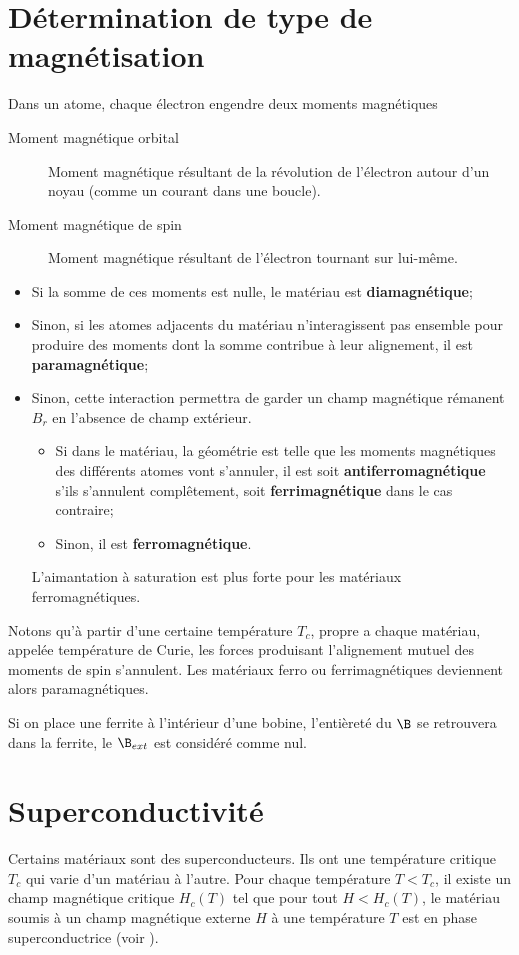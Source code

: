 \section{Détermination de type de magnétisation}
Dans un atome, chaque électron engendre deux moments magnétiques
\begin{description}
  \item[Moment magnétique orbital]
    Moment magnétique résultant de la révolution de
    l'électron autour d'un noyau (comme un courant dans une boucle).
  \item[Moment magnétique de spin]
    Moment magnétique résultant de l'électron tournant sur lui-même.
\end{description}
\begin{itemize}
  \item Si la somme de ces moments est nulle,
    le matériau est \textbf{diamagnétique};
  \item Sinon, si les atomes adjacents du matériau n'interagissent pas
    ensemble pour produire des moments dont la somme contribue
    à leur alignement, il est \textbf{paramagnétique};
  \item Sinon, cette interaction permettra de garder un champ magnétique
    rémanent $B_r$ en l'absence de champ extérieur.
    \begin{itemize}
      \item Si dans le matériau,
        la géométrie est telle que les moments magnétiques des différents
        atomes vont s'annuler,
        il est soit \textbf{antiferromagnétique} s'ils s'annulent complêtement,
        soit \textbf{ferrimagnétique} dans le cas contraire;
      \item Sinon, il est \textbf{ferromagnétique}.
    \end{itemize}
    L'aimantation à saturation est plus forte pour
    les matériaux ferromagnétiques.
\end{itemize}
Notons qu'à partir d'une certaine température $T_c$,
propre a chaque matériau,
appelée température de Curie, les forces produisant l'alignement mutuel
des moments de spin s'annulent.
Les matériaux ferro ou ferrimagnétiques deviennent alors paramagnétiques.

Si on place une ferrite à l'intérieur d'une bobine,
l'entièreté du $\B$ se retrouvera dans la ferrite,
le $\B_{ext}$ est considéré comme nul.

\section{Superconductivité}
Certains matériaux sont des superconducteurs.
Ils ont une température critique $T_c$ qui varie d'un matériau à l'autre.
Pour chaque température $T < T_c$,
il existe un champ magnétique critique $H_c(T)$ tel que
pour tout $H < H_c(T)$, le matériau soumis à un champ magnétique externe $H$
à une température $T$ est en phase superconductrice
(voir ).


